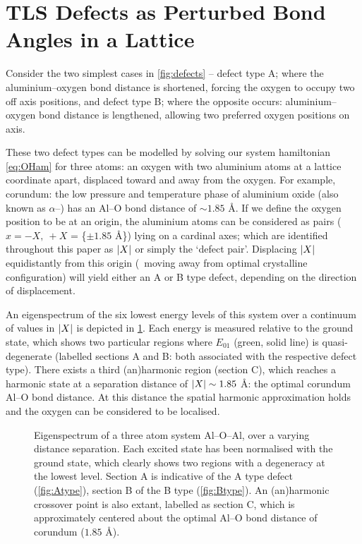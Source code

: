 \section[TLSs as Perturbed Bond Angles]{TLS Defects as Perturbed Bond Angles in a Lattice}\label{sec:bonds}

Consider the two simplest cases in \cref{fig:defects} -- defect type A; where the aluminium--oxygen bond distance is shortened, forcing the oxygen to occupy two off axis positions, and defect type B; where the opposite occurs: aluminium--oxygen bond distance is lengthened, allowing two preferred oxygen positions on axis.

These two defect types can be modelled by solving our system hamiltonian \cref{eq:OHam} for three atoms: an oxygen with two aluminium atoms at a lattice coordinate apart, displaced toward and away from the oxygen.
For example, corundum: the low pressure and temperature phase of aluminium oxide (also known as $\alpha$--) has an Al--O bond distance of $\sim\!1.85$ \AA.
If we define the oxygen position to be at an origin, the aluminium atoms can be considered as pairs ($x = -X, \: +X$ = \{$\pm 1.85$ \AA\}) lying on a cardinal axes; which are identified throughout this paper as $\lvert X\rvert$ or simply the `defect pair'.
Displacing $\lvert X\rvert$ equidistantly from this origin (\ie\ moving away from optimal crystalline configuration) will yield either an A or B type defect, depending on the direction of displacement.

An eigenspectrum of the six lowest energy levels of this system over a continuum of values in $\lvert X\rvert$  is depicted in \cref{fig:spectrum}.
Each energy is measured relative to the ground state, which shows two particular regions where $E_{01}$ (green, solid line) is quasi-degenerate (labelled sections A and B: both associated with the respective defect type).
There exists a third (an)harmonic region (section C), which reaches a harmonic state at a separation distance of $\lvert X\rvert \sim 1.85$ \AA: the optimal corundum Al--O bond distance.
At this distance the spatial harmonic approximation holds and the oxygen can be considered to be localised.

\begin{figure}[htp]
  \resizebox{0.9\textwidth}{!}{}
  \caption[Three atom eigenspectrum]{\label{fig:spectrum}Eigenspectrum of a three atom system Al--O--Al, over a varying distance separation. Each excited state has been normalised with the ground state, which clearly shows two regions with a degeneracy at the lowest level. Section A is indicative of the A type defect (\cref{fig:Atype}), section B of the B type (\cref{fig:Btype}). An (an)harmonic crossover point is also extant, labelled as section C, which is approximately centered about the optimal Al--O bond distance of corundum ($1.85$ \AA).}
\end{figure}


